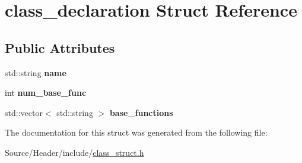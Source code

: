 \hypertarget{structclass__declaration}{\section{class\-\_\-declaration Struct Reference}
\label{structclass__declaration}
}
\subsection*{Public Attributes}
\begin{DoxyCompactItemize}
\item 
\hypertarget{structclass__declaration_a229b8498e65c3e4507d277e21dc96dd3}{std\-::string {\bfseries name}}\label{structclass__declaration_a229b8498e65c3e4507d277e21dc96dd3}

\item 
\hypertarget{structclass__declaration_ac24e45ec54868aa640b6287779ebe74d}{int {\bfseries num\-\_\-base\-\_\-func}}\label{structclass__declaration_ac24e45ec54868aa640b6287779ebe74d}

\item 
\hypertarget{structclass__declaration_a057735aa678db0370f6c4d24791f78fd}{std\-::vector$<$ std\-::string $>$ {\bfseries base\-\_\-functions}}\label{structclass__declaration_a057735aa678db0370f6c4d24791f78fd}

\end{DoxyCompactItemize}


The documentation for this struct was generated from the following file\-:\begin{DoxyCompactItemize}
\item 
Source/\-Header/include/\hyperlink{class__struct_8h}{class\-\_\-struct.\-h}\end{DoxyCompactItemize}
